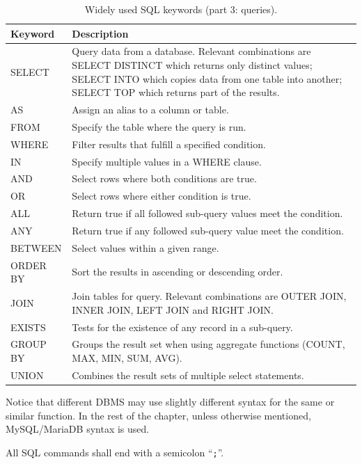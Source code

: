 \begin{table}[!htb]
	\centering \caption{Widely used SQL keywords (part 3: queries).}\label{ch:db:tab:sqlkeywords3}
	\begin{tabularx}{\textwidth}{lX}
		\hline
		Keyword & Description \\ \hline
		SELECT & Query data from a database. Relevant combinations are SELECT DISTINCT which returns only distinct values; SELECT INTO which copies data from one table into another; SELECT TOP which returns part of the results. \\ 
		AS & Assign an alias to a column or table. \\ 
		FROM & Specify the table where the query is run. \\ 
		WHERE & Filter results that fulfill a specified condition. \\ 
		IN & Specify multiple values in a WHERE clause. \\ 
		AND & Select rows where both conditions are true. \\ 
		OR & Select rows where either condition is true. \\ 
		ALL & Return true if all followed sub-query values meet the condition. \\ 
		ANY & Return true if any followed sub-query value meet the condition. \\ 
		BETWEEN & Select values within a given range. \\ 
		ORDER BY & Sort the results in ascending or descending order. \\ 
		JOIN & Join tables for query. Relevant combinations are OUTER JOIN, INNER JOIN, LEFT JOIN and RIGHT JOIN. \\ 
		EXISTS & Tests for the existence of any record in a sub-query. \\ 
		GROUP BY & Groups the result set when using aggregate functions (COUNT, MAX, MIN, SUM, AVG). \\ 
		UNION & Combines the result sets of multiple select statements. \\
		 \hline
	\end{tabularx}
\end{table}

Notice that different DBMS may use slightly different syntax for the same or similar function. In the rest of the chapter, unless otherwise mentioned, MySQL/MariaDB syntax is used. 

All SQL commands shall end with a semicolon ``\verb|;|''.

